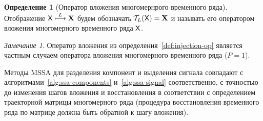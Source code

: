 \documentclass[specialist,
  substylefile=spbu_report.rtx,
subf,href,colorlinks=true, 12pt]{disser}
\theoremstyle{plain}
\theoremstyle{definition}
\newtheorem{definition}{Определение}[section]
\theoremstyle{remark}
\newtheorem{remark}{Замечание}[section]
\begin{document}
\begin{definition}[Оператор вложения многомернрого временного ряда]
  Отображение $\mathsf{X} \stackrel{L}{\longmapsto} \mathbf{X}$ будем обозначать
  $\mathcal{T}_L(\mathsf{X}) = \mathbf{X}$ и называть его оператором вложения многомерного
  временного ряда $\mathsf{X}$.
\end{definition}

\begin{remark}
  Оператор вложения из определения~\ref{def:injection-op} является
  частным случаем оператора вложения многомерного временного ряда
  ($P=1$).
\end{remark}

Методы MSSA для разделения компонент и выделения сигнала совпадают с
алгоритмами~\ref{alg:ssa-components}
и~\ref{alg:ssa-signal} соответственно, с точностью до изменения шагов
вложения и восстановления в соответствии
с определением траекторной матрицы многомерного ряда (процедура
  восстановления временного ряда по
матрице должна быть обратной к шагу вложения).
\end{document}
